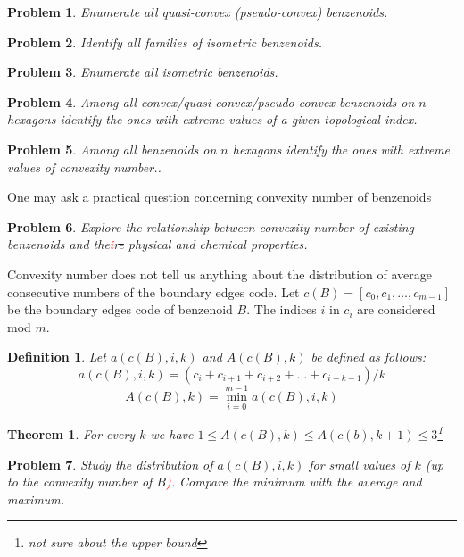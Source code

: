 \documentclass[a4paper,10pt]{article}
\newcounter{theorem}
\newtheorem{definition}{Definition}[section]
\newtheorem{theorem}{Theorem}[section]
\newtheorem{problem}{Problem}[section]
\newcommand\TODO[1]{\textcolor{red}{#1}}
\begin{document}
{\begin{problem}
Enumerate all quasi-convex (pseudo-convex) benzenoids.
\end{problem}


\begin{problem}
Identify all families of isometric benzenoids.
\end{problem}

\begin{problem}
Enumerate all isometric benzenoids.
\end{problem}

\begin{problem}
Among all convex/quasi convex/pseudo convex benzenoids on $n$ hexagons identify the ones with extreme values of a given topological index.
\end{problem}

\begin{problem}
Among all benzenoids on $n$ hexagons identify the ones with extreme values of convexity number..
\end{problem}

One may ask a practical question concerning convexity number of benzenoids

\begin{problem}
Explore the relationship between convexity number of existing benzenoids and the\TODO{i}r\sout{e} physical and chemical properties.
\end{problem}

Convexity number does not tell us anything about the distribution of average consecutive numbers of the boundary edges code.
Let $c(B) = [c_0,c_1,\ldots, c_{m-1}]$ be the boundary edges code of benzenoid $B$. The indices $i$ in $c_i$ are considered mod $m$. 

\begin{definition}
Let $a(c(B),i,k)$ and $A(c(B),k)$ be defined as follows:
$$a(c(B),i,k) = (c_i + c_{i+1}+c_{i+2}+\ldots+c_{i+k-1})/k$$ 
$$A(c(B),k) = \min_{i =0}^{m-1}a(c(B),i,k)$$
\end{definition}


\begin{theorem}
For every $k$ we have $1\leq A(c(B),k) \leq A(c(b),k+1) \leq 3$\footnote{not sure about the upper bound}
\end{theorem}


\begin{problem}
Study the distribution of $a(c(B),i,k)$ for small values of $k$ (up to the convexity number of $B$\TODO{)}. Compare the minimum with the average and maximum.
\end{problem}



}
\end{document}
